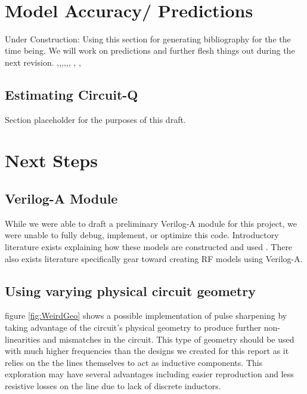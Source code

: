 \documentclass[journal]{IEEEtran}
\begin{document}
\



\section{ Model Accuracy/ Predictions }
Under Construction: Using this section for generating bibliography for the the time being. We will work on predictions and further flesh things out during the next revision.
\cite{ould2011circuit} \cite{distributedAnalogPhase},\cite{ellinger2003varactor},\cite{lee2012nonlinear},\cite{UltraCompact},\cite{EffVaractorCharac},\cite{FastHighVoltageNLTL}, \cite{nikoo2018theory}, \cite{TwoLine},\cite{ComputerExpNLTL}


\subsection{Estimating Circuit-Q}
Section placeholder for the purposes of this draft.


\section{Next Steps}\label{sec:NextSteps}



\subsection{Verilog-A Module}
    While we were able to draft a preliminary Verilog-A module for this project, we were unable to fully debug, implement, or optimize this code. Introductory literature exists explaining how these models are constructed and used \cite{VerilogAFun}. There also exists literature specifically gear toward creating RF models using Verilog-A\cite{VerilogARF}.
    
    




\subsection{Using varying physical circuit geometry}

figure \ref{fig:WeirdGeo} shows a possible implementation of pulse sharpening by taking advantage of the circuit's physical geometry to produce further non-linearities and mismatches in the circuit. This type of geometry should be used with much higher frequencies than the designs we created for this report as it relies on the the lines themselves to act as inductive components. This  exploration may have several advantages including easier reproduction and less resistive losses on the line due to lack of discrete inductors. 
\end{document}
